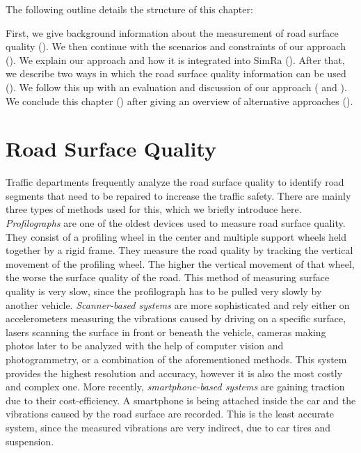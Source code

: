 The following outline details the structure of this chapter:

First, we give background information about the measurement of road surface quality ().
We then continue with the scenarios and constraints of our approach ().
We explain our approach and how it is integrated into SimRa ().
After that, we describe two ways in which the road surface quality information can be used ().
We follow this up with an evaluation and discussion of our approach ( and ).
We conclude this chapter () after giving an overview of alternative approaches ().

\section{Road Surface Quality}
\label{sec:surface_quality_background}
Traffic departments frequently analyze the road surface quality to identify road segments that need to be repaired to increase the traffic safety.
There are mainly three types of methods used for this, which we briefly introduce here.
\textit{Profilographs} are one of the oldest devices used to measure road surface quality.
They consist of a profiling wheel in the center and multiple support wheels held together by a rigid frame.
They measure the road quality by tracking the vertical movement of the profiling wheel.
The higher the vertical movement of that wheel, the worse the surface quality of the road.
This method of measuring surface quality is very slow, since the profilograph has to be pulled very slowly by another vehicle.
\textit{Scanner-based systems} are more sophisticated and rely either on accelerometers measuring the vibrations caused by driving on a specific surface, lasers scanning the surface in front or beneath the vehicle, cameras making photos later to be analyzed with the help of computer vision and photogrammetry, or a combination of the aforementioned methods.
This system provides the highest resolution and accuracy, however it is also the most costly and complex one.
More recently, \textit{smartphone-based systems} are gaining traction due to their cost-efficiency.
A smartphone is being attached inside the car and the vibrations caused by the road surface are recorded.
This is the least accurate system, since the measured vibrations are very indirect, due to car tires and suspension.


